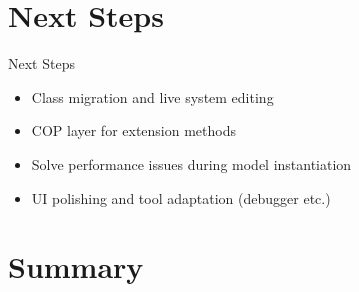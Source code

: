 \documentclass[xcolor=dvipsname, handout]{beamer} %
\begin{document}
\section{Next Steps}

\begin{frame}{Next Steps}
  \begin{itemize}
    \item Class migration and live system editing
    \item COP layer for extension methods
    \item Solve performance issues during model instantiation
    \item UI polishing and tool adaptation (debugger etc.)
  \end{itemize}
\end{frame}

\section{Summary}
\end{document}
